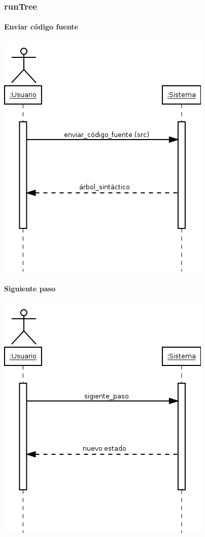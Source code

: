 \subsubsection{runTree}
\paragraph{Enviar código fuente}
\begin{center}
\includegraphics[scale=0.4]{enviar_codigo_fuente.png} \\
\end{center}
\paragraph{Siguiente paso}
\begin{center}
\includegraphics[scale=0.4]{siguiente_paso.png} \\
\end{center}
